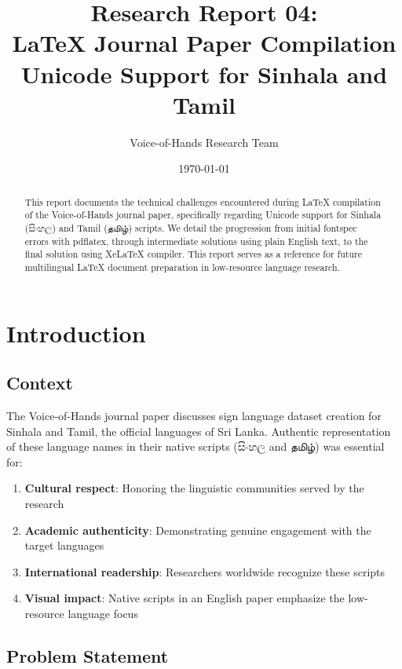 \documentclass[11pt,a4paper]{article}
\title{\textbf{Research Report 04:}\\LaTeX Journal Paper Compilation\\Unicode Support for Sinhala and Tamil}
\author{Voice-of-Hands Research Team}
\date{\today}
\begin{document}
\maketitle

\begin{abstract}
This report documents the technical challenges encountered during LaTeX compilation of the Voice-of-Hands journal paper, specifically regarding Unicode support for Sinhala (සිංහල) and Tamil (தமிழ்) scripts. We detail the progression from initial fontspec errors with pdflatex, through intermediate solutions using plain English text, to the final solution using XeLaTeX compiler. This report serves as a reference for future multilingual LaTeX document preparation in low-resource language research.
\end{abstract}

\tableofcontents
\newpage

\section{Introduction}

\subsection{Context}

The Voice-of-Hands journal paper discusses sign language dataset creation for Sinhala and Tamil, the official languages of Sri Lanka. Authentic representation of these language names in their native scripts (සිංහල and தமிழ்) was essential for:

\begin{enumerate}
    \item \textbf{Cultural respect}: Honoring the linguistic communities served by the research
    \item \textbf{Academic authenticity}: Demonstrating genuine engagement with the target languages
    \item \textbf{International readership}: Researchers worldwide recognize these scripts
    \item \textbf{Visual impact}: Native scripts in an English paper emphasize the low-resource language focus
\end{enumerate}

\subsection{Problem Statement}
\end{document}
